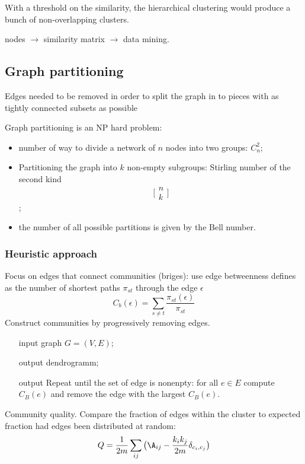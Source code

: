 \documentclass[a4paper]{article}
\begin{document}
With a threshold on the similarity, the hierarchical clustering would produce a bunch of non-overlapping clusters.

nodes $\to$ similarity matrix $\to$ data mining.

\subsection{Graph partitioning} %
\label{sub:graph_partitioning}

Edges needed to be removed in order to split the graph in to pieces with as tightly connected subsets as possible


Graph partitioning is an NP hard problem: \begin{itemize}
	\item number of way to divide a network of $n$ nodes into two groups: $C^2_n$;
	\item Partitioning the graph into $k$ non-empty subgroups: Stirling number of the second kind \[\big[\begin{matrix}n\\k\end{matrix}\big]\];
	\item the number of all possible partitions is given by the Bell number.
\end{itemize}

\subsubsection{Heuristic approach} %
\label{ssub:heuristic_approach}

Focus on edges that connect communities (briges): use edge betweenness defines as the number of shortest paths $\pi_{st}$ through the edge $\epsilon$
\[C_b(\epsilon) = \sum_{s\neq t} \frac{\pi_{st}(\epsilon)}{\pi_{st}}\]
Construct communities by progressively removing edges.

\begin{itemize}
	\item[input] graph $G=(V,E)$;
	\item[output] dendrogramm;
	\item[output] Repeat until the set of edge is nonenpty:
	for all $e\in E$ compute $C_B(e)$ and remove the edge with the largest $C_B(e)$.
\end{itemize}

Community quality. Compare the fraction of edges within the cluster to expected fraction had edges been distributed at random:
\[Q = \frac{1}{2m}\sum_{ij} \big(\A_{ij} - \frac{k_ik_j}{2m} \delta_{c_i,c_j}\big)\]
\end{document}
